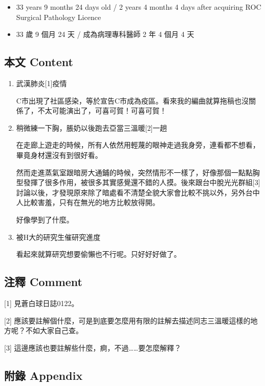 \documentclass[
]{article}
\providecommand{\tightlist}{%
  \setlength{\itemsep}{0pt}\setlength{\parskip}{0pt}}
\begin{document}
\begin{itemize}
\tightlist
\item
  33 years 9 months 24 days old / 2 years 4 months 4 days after
  acquiring ROC Surgical Pathology Licence
\item
  33 歲 9 個月 24 天 / 成為病理專科醫師 2 年 4 個月 4 天
\end{itemize}

\hypertarget{ux672cux6587-content-15}{%
\subsection{本文 Content}\label{ux672cux6587-content-15}}

\begin{enumerate}
\def\labelenumi{\arabic{enumi}.}
\item
  武漢肺炎{[}1{]}疫情

  C市出現了社區感染，等於宣告C市成為疫區。看來我的編曲就算拖稿也沒關係了，不太可能演出了，可喜可賀！可喜可賀！
\item
  稍微練一下胸，脹奶以後跑去亞當三溫暖{[}2{]}一趟

  在走廊上遊走的時候，所有人依然用輕蔑的眼神走過我身旁，連看都不想看，畢竟身材還沒有到很好看。

  然而走進蒸氣室跟暗房大通鋪的時候，突然情形不一樣了，好像那個一點點胸型發揮了很多作用，被很多其實感覺還不錯的人摸。後來跟台中脫光光群組{[}3{]}討論以後，才發現原來除了暗處看不清楚全貌大家會比較不挑以外，另外台中人比較害羞，只有在無光的地方比較放得開。

  好像學到了什麼。
\item
  被H大的研究生催研究進度

  看起來就算研究想要偷懶也不行呢。只好好好做了。
\end{enumerate}

\hypertarget{ux6ce8ux91cb-comment-15}{%
\subsection{注釋 Comment}\label{ux6ce8ux91cb-comment-15}}

{[}1{]} 見蒼白球日誌0122。

{[}2{]}
應該要註解個什麼，可是到底要怎麼用有限的註解去描述同志三溫暖這樣的地方呢？不如大家自己查。

{[}3{]} 這邊應該也要註解些什麼，痾，不過\ldots\ldots 要怎麼解釋？

\hypertarget{ux9644ux9304-appendix-15}{%
\subsection{附錄 Appendix}\label{ux9644ux9304-appendix-15}}
\end{document}
